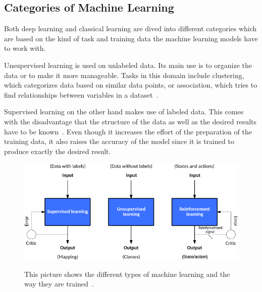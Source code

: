 
\subsection{Categories of Machine Learning}
Both deep learning and classical learning are dived into different categories which are based on the kind of task and training data the machine learning models have to work with.

Unsupervised learning is used on unlabeled data. Its main use is to organize the data or to make it more manageable. Tasks in this domain include clustering, which categorizes data based on similar data points, or association, which tries to find relationships between variables in a dataset~\cite{supervised-unsupervised-learning}.

Supervised learning on the other hand makes use of labeled data. This comes with the disadvantage that the structure of the data as well as the desired results have to be known~\cite{classical-ml}. Even though it increases the effort of the preparation of the training data, it also raises the accuracy of the model since it is trained to produce exactly the desired result.



\begin{figure}[ht]
  \caption[Different kinds of machine learning]{This picture shows the different types of machine learning and the way they are trained~\cite{types-of-ml}.} %
  \centering
  \includegraphics[width=\linewidth]{img/types_of_machine_learning.png}\label{fig:kinds_of_ml}
\end{figure}
